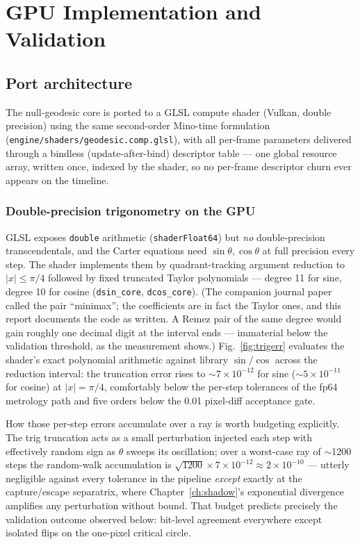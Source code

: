 \chapter{GPU Implementation and Validation}
\label{ch:gpu}

\section{Port architecture}
\label{sec:gpuport}

The null-geodesic core is ported to a GLSL compute shader (Vulkan,
double precision) using the same second-order Mino-time formulation
(\texttt{engine/shaders/geodesic.comp.glsl}), with all per-frame
parameters delivered through a bindless (update-after-bind) descriptor
table — one global resource array, written once, indexed by the shader,
so no per-frame descriptor churn ever appears on the timeline.

\subsection{Double-precision trigonometry on the GPU}

GLSL exposes \texttt{double} arithmetic (\texttt{shaderFloat64}) but
\emph{no} double-precision transcendentals, and the Carter equations
need $\sin\theta, \cos\theta$ at full precision every step. The shader
implements them by quadrant-tracking argument reduction to
$|x| \le \pi/4$ followed by fixed truncated Taylor polynomials — degree
11 for sine, degree 10 for cosine (\texttt{dsin\_core},
\texttt{dcos\_core}). (The companion journal paper called the pair
``minimax''; the coefficients are in fact the Taylor ones, and this
report documents the code as written. A Remez pair of the same degree
would gain roughly one decimal digit at the interval ends — immaterial
below the validation threshold, as the measurement shows.)
Fig.~\ref{fig:trigerr} evaluates the shader's exact polynomial
arithmetic against library $\sin/\cos$ across the reduction interval:
the truncation error rises to $\sim 7\times10^{-12}$ for sine
($\sim 5\times10^{-11}$ for cosine) at $|x| = \pi/4$, comfortably below
the per-step tolerances of the fp64 metrology path and five orders
below the 0.01 pixel-diff acceptance gate.

How those per-step errors accumulate over a ray is worth budgeting
explicitly. The trig truncation acts as a small perturbation injected
each step with effectively random sign as $\theta$ sweeps its
oscillation; over a worst-case ray of $\sim$1200 steps the random-walk
accumulation is $\sqrt{1200}\times7\times10^{-12} \approx
2\times10^{-10}$ — utterly negligible against every tolerance in the
pipeline \emph{except} exactly at the capture/escape separatrix, where
Chapter~\ref{ch:shadow}'s exponential divergence amplifies any
perturbation without bound. That budget predicts precisely the
validation outcome observed below: bit-level agreement everywhere
except isolated flips on the one-pixel critical circle.

